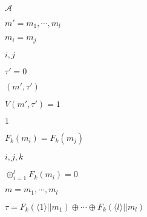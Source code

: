 \documentclass[10pt]{book}
\begin{document}
\begin{mdSnippets}
\begin{mdInlineSnippet}[ad70146b431bea9ae74cf8385470c544]
$\mathcal{A}$\end{mdInlineSnippet}%
\begin{mdInlineSnippet}[1dd6cfdb9677d15d861bc700937555bb]%
$m' = m_1, \cdots, m_l$\end{mdInlineSnippet}%
\begin{mdInlineSnippet}%
$m_i = m_j$\end{mdInlineSnippet}%
\begin{mdInlineSnippet}[ee813f0ede8664a8049b1b6720f03b60]%
$i,j$\end{mdInlineSnippet}%
\begin{mdInlineSnippet}%
$\tau' = 0$\end{mdInlineSnippet}%
\begin{mdInlineSnippet}[761491c241fd4d2d79a17a02e0811a53]%
$(m',\tau')$\end{mdInlineSnippet}%
\begin{mdInlineSnippet}[5b6e1e698217559a88f8216add17ab17]%
$V(m',\tau') = 1$\end{mdInlineSnippet}%
\begin{mdInlineSnippet}[c4ca4238a0b923820dcc509a6f75849b]%
$1$\end{mdInlineSnippet}%
\begin{mdInlineSnippet}[78786928314394488be8a95db2828e10]%
$F_k(m_i) = F_k(m_j)$\end{mdInlineSnippet}%
\begin{mdInlineSnippet}[20d172080f660ac3d58312127d2d6a3f]%
$i,j,k$\end{mdInlineSnippet}%
\begin{mdInlineSnippet}%
$\oplus_{i=1}^{l} F_k(m_i) = 0$\end{mdInlineSnippet}%
\begin{mdInlineSnippet}[f004505f7c94fd2bfa941c6136077f5e]%
$m = m_1, \cdots, m_l$\end{mdInlineSnippet}%
\begin{mdInlineSnippet}[a9c743f128718b0286d71989a7cf7096]%
$\tau = F_k(\langle 1 \rangle || m_1) \oplus \cdots \oplus F_k(\langle l \rangle || m_l)$\end{mdInlineSnippet}%

\end{mdSnippets}
\end{document}
